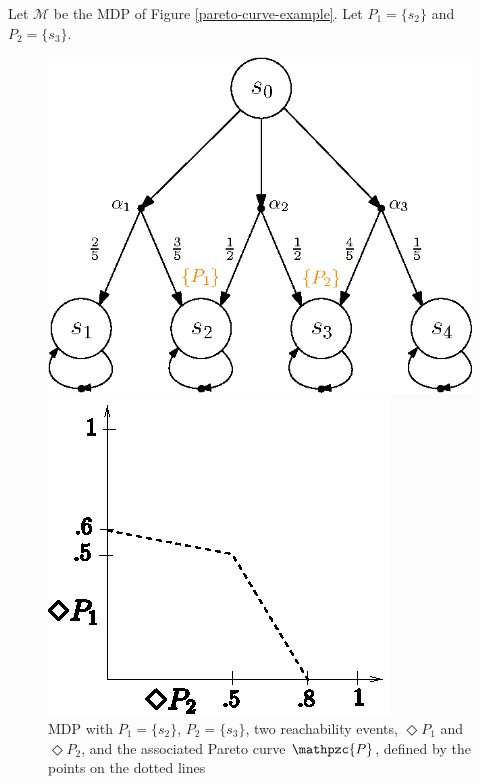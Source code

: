 \begin{example}
Let $\mathcal{M}$ be the MDP of Figure \ref{pareto-curve-example}.
Let $P_1 = \{ s_2 \}$ and $P_2 = \{s_3\}$.
  \begin{figure}[h]
    \begin{minipage}{0.5\linewidth}
      \centering
      \includegraphics[width=0.8\linewidth]{resources/pareto-curve-MDP}
    \end{minipage}
    \begin{minipage}{0.5\linewidth}
      \centering
      \includegraphics[width=0.7\linewidth]{resources/pareto-curve}
    \end{minipage}
    \captionsetup{justification=centering}
    \caption{MDP with $P_1 = \{s_2\}$, $P_2 = \{s_3\}$, two reachability events, $\Diamond P_1$ and $\Diamond P_2$, and the associated Pareto curve $\mathpzc{P}$, defined by the points on the dotted lines}

\end{figure}
\end{example}

